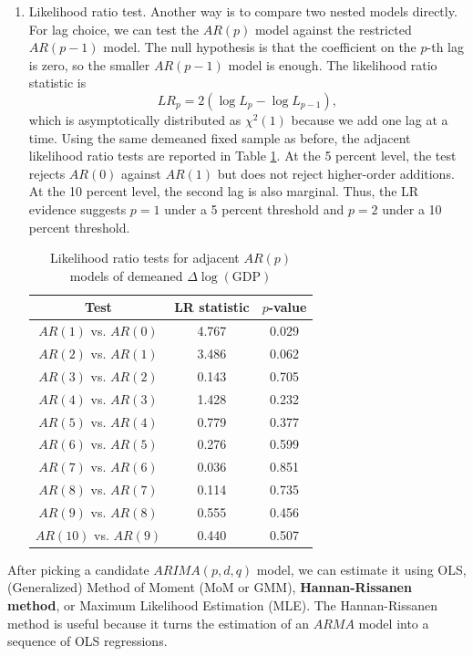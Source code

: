 \documentclass[12pt]{article}
\begin{document}
\begin{enumerate}
    \item Likelihood ratio test. Another way is to compare two nested models directly. For lag choice, we can test the $AR(p)$ model against the restricted $AR(p-1)$ model. The null hypothesis is that the coefficient on the $p$-th lag is zero, so the smaller $AR(p-1)$ model is enough. The likelihood ratio statistic is
    \[
        LR_p = 2\left(\log L_p - \log L_{p-1}\right),
    \]
    which is asymptotically distributed as $\chi^2(1)$ because we add one lag at a time. Using the same demeaned fixed sample as before, the adjacent likelihood ratio tests are reported in Table \ref{tab:rgdp-logdiff-lr}. At the 5 percent level, the test rejects $AR(0)$ against $AR(1)$ but does not reject higher-order additions. At the 10 percent level, the second lag is also marginal. Thus, the LR evidence suggests $p=1$ under a 5 percent threshold and $p=2$ under a 10 percent threshold.

    \begin{table}[H]
        \centering
        \caption{Likelihood ratio tests for adjacent $AR(p)$ models of demeaned $\Delta \log(\text{GDP})$}
        \label{tab:rgdp-logdiff-lr}
        \begin{tabular}{ccc}
            \toprule
            Test & LR statistic & $p$-value \\
            \midrule
            $AR(1)$ vs. $AR(0)$ & 4.767 & 0.029 \\
            $AR(2)$ vs. $AR(1)$ & 3.486 & 0.062 \\
            $AR(3)$ vs. $AR(2)$ & 0.143 & 0.705 \\
            $AR(4)$ vs. $AR(3)$ & 1.428 & 0.232 \\
            $AR(5)$ vs. $AR(4)$ & 0.779 & 0.377 \\
            $AR(6)$ vs. $AR(5)$ & 0.276 & 0.599 \\
            $AR(7)$ vs. $AR(6)$ & 0.036 & 0.851 \\
            $AR(8)$ vs. $AR(7)$ & 0.114 & 0.735 \\
            $AR(9)$ vs. $AR(8)$ & 0.555 & 0.456 \\
            $AR(10)$ vs. $AR(9)$ & 0.440 & 0.507 \\
            \bottomrule
        \end{tabular}
    \end{table}
\end{enumerate}

After picking a candidate $ARIMA(p,d,q)$ model, we can estimate it using OLS, (Generalized) Method of Moment (MoM or GMM), \textbf{Hannan-Rissanen method}, or Maximum Likelihood Estimation (MLE). The Hannan-Rissanen method is useful because it turns the estimation of an $ARMA$ model into a sequence of OLS regressions.
\end{document}
